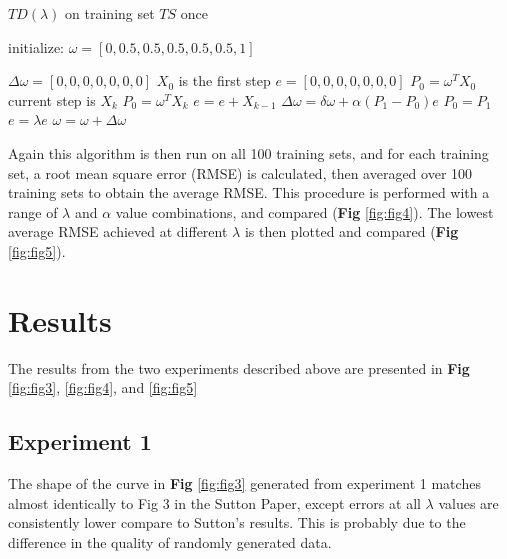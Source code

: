 \documentclass[10pt]{article}
\begin{document}
\begin{algorithm}
\caption{$TD(\lambda)$ on training set $TS$ once}
\begin{algorithmic}
\STATE initialize: $\omega=[0,0.5,0.5,0.5,0.5,0.5,1]$

\STATE $\Delta\omega=[0,0,0,0,0,0,0]$
\STATE $X_0$ is the first step
\STATE $e=[0,0,0,0,0,0,0]$
\STATE $P_0=\omega^T X_0$
\STATE current step is $X_k$
\STATE $P_0=\omega^T X_k$
\STATE $e=e+X_{k-1}$
\STATE $\Delta\omega=\delta\omega+\alpha (P_1-P_0)e$
\STATE $P_0=P_1$
\STATE $e=\lambda e$
\ENDFOR
\STATE $\omega=\omega+\Delta\omega$
\ENDFOR


\end{algorithmic}
\end{algorithm}

Again this algorithm is then run on all 100 training sets, and for each training set, a root mean square error (RMSE) is calculated, then averaged over 100 training sets to obtain the average RMSE. This procedure is performed with a range of $\lambda$ and $\alpha$ value combinations, and compared (\textbf{Fig} \ref{fig:fig4}). The lowest average RMSE achieved at different $\lambda$ is then plotted and compared (\textbf{Fig} \ref{fig:fig5}).




\section{Results} \label{results}

The results from the two experiments described above are presented in \textbf{Fig} \ref{fig:fig3}, \ref{fig:fig4}, and \ref{fig:fig5}


\subsection{Experiment 1} \label{results1}
The shape of the curve in \textbf{Fig} \ref{fig:fig3} generated from experiment 1 matches almost identically to Fig 3 in the Sutton Paper, except errors at all $\lambda$ values are consistently lower compare to Sutton's results. This is probably due to the difference in the quality of randomly generated data.
\end{document}
